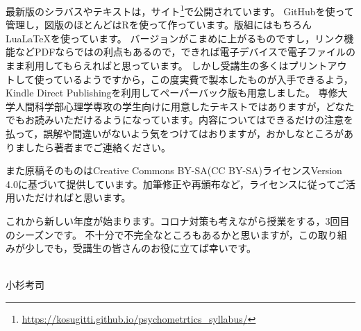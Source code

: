 最新版のシラバスやテキストは，サイト\footnote{\url{https://kosugitti.github.io/psychometrtics_syllabus/}}で公開されています。
GitHubを使って管理し，図版のほとんどはRを使って作っています。版組にはもちろんLua\LaTeX を使っています。
バージョンがこまめに上がるものですし，リンク機能などPDFならではの利点もあるので，できれば電子デバイスで電子ファイルのまま利用してもらえればと思っています。
しかし受講生の多くはプリントアウトして使っているようですから，この度実費で製本したものが入手できるよう，Kindle Direct Publishingを利用してペーパーバック版も用意しました。
専修大学人間科学部心理学専攻の学生向けに用意したテキストではありますが，どなたでもお読みいただけるようになっています。内容についてはできるだけの注意を払って，誤解や間違いがないよう気をつけてはおりますが，おかしなところがありましたら著者までご連絡ください。

また原稿そのものはCreative Commons BY-SA(CC BY-SA)ライセンスVersion 4.0に基づいて提供しています。加筆修正や再頒布など，ライセンスに従ってご活用いただければと思います。



これから新しい年度が始まります。コロナ対策も考えながら授業をする，3回目のシーズンです。
不十分で不完全なところもあるかと思いますが，この取り組みが少しでも，受講生の皆さんのお役に立てば幸いです。


\begin{flushright}
	\date{\today}\\
	小杉考司
\end{flushright}

